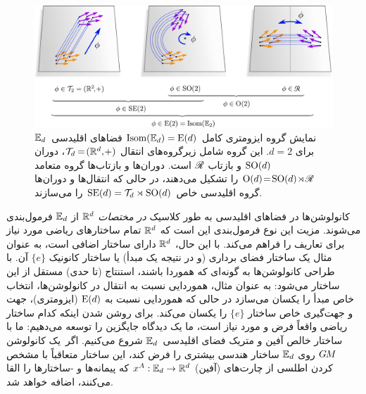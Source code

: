 \begin{figure}
	\centering
	\includegraphics[width=1.\textwidth]{figures/isometry_plane.pdf}
	\vspace*{.1ex}
	\caption{\small
		نمایش گروه ایزومتری کامل $\operatorname{Isom}(\mathbb{E}_d) = \operatorname{E}(d)$ فضاهای اقلیدسی~$\mathbb{E}_d$ برای $d=2$.
		این گروه شامل زیرگروه‌های انتقال $\mathcal{T}_d \mkern-1mu=\! (\mathbb{R}^d,\mkern-2mu+)$، دوران $\operatorname{SO}(d)$ و بازتاب $\mathscr{R}$ است.
		دوران‌ها و بازتاب‌ها گروه متعامد ${\operatorname{O}(d) \!=\! \operatorname{SO}(d) \!\rtimes\! \mathscr{R}}$ را تشکیل می‌دهند، در حالی که انتقال‌ها و دوران‌ها گروه اقلیدسی خاص $\operatorname{SE}(d) = \mathcal{T}_d \rtimes \operatorname{SO}(d)$ را می‌سازند.
	}
	\label{fig:isometries_plane}
\end{figure}

کانولوشن‌ها در فضاهای اقلیدسی به طور کلاسیک \emph{در مختصات} $\mathbb{R}^d$ از $\mathbb{E}_d$ فرمول‌بندی می‌شوند.
مزیت این نوع فرمول‌بندی این است که $\mathbb{R}^d$ تمام ساختارهای ریاضی مورد نیاز برای تعاریف را فراهم می‌کند.
با این حال، $\mathbb{R}^d$ دارای ساختار اضافی است، به عنوان مثال یک ساختار فضای برداری (و در نتیجه یک مبدأ) یا ساختار کانونیک $\{e\}$ آن.
با طراحی کانولوشن‌ها به گونه‌ای که هموردا باشند، استنتاج (تا حدی) مستقل از این ساختار می‌شود:
به عنوان مثال، هموردایی نسبت به انتقال در کانولوشن‌ها، انتخاب خاص مبدأ را یکسان می‌سازد در حالی که هموردایی نسبت به $\operatorname{E}(d)$ (ایزومتری)، جهت و جهت‌گیری خاص ساختار $\{e\}$ را یکسان می‌کند.
برای روشن شدن اینکه کدام ساختار ریاضی واقعاً فرض و مورد نیاز است، ما یک دیدگاه جایگزین را توسعه می‌دهیم:
ما با ساختار خالص آفین و متریک فضای اقلیدسی~$\mathbb{E}_d$ شروع می‌کنیم.
اگر~یک کانولوشن $G\mkern-1.4muM$ روی $\mathbb{E}_d$ ساختار هندسی بیشتری را فرض کند، این ساختار متعاقباً با مشخص کردن اطلسی از چارت‌های (آفین) $x^A: \mathbb{E}_d \to \mathbb{R}^d$ که پیمانه‌ها و -ساختارها را القا می‌کنند، اضافه خواهد شد.

\pagebreak

\etocsettocstyle{}{} %
\localtableofcontents


